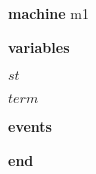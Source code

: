 \begin{block}
  \item   \textbf{machine} m1
  \item   \textbf{variables}
  \begin{block}
    \item   $st$
    \item   $term$
  \end{block}
  \item   
  \item   
  \item   
  \item   \textbf{events}
  \begin{block}
    \item   
    \item   
    \item   
  \end{block}
  \item   \textbf{end} \\
\end{block}
